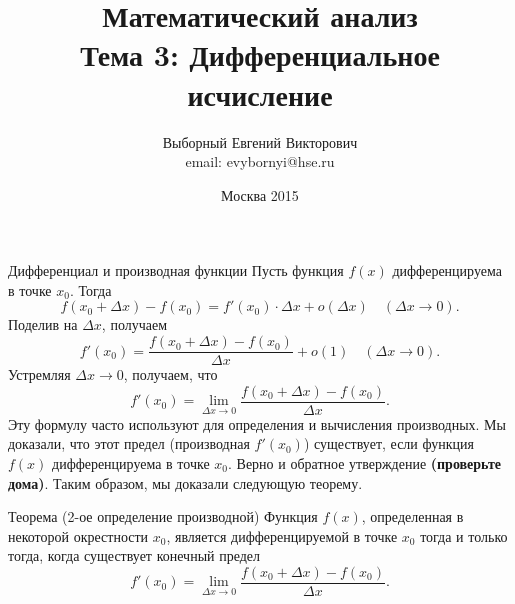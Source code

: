 \documentclass[8pt]{beamer}
\title[Дифференциальное исчисление]{Математический анализ\\ Тема 3: Дифференциальное исчисление}
\author[Выборный Е. В.]{Выборный Евгений Викторович\\ email: evybornyi@hse.ru}
\date{Москва 2015}
\begin{document}

\begin{frame}
\titlepage
\end{frame}


\begin{frame}{Дифференциал и производная функции}
Пусть функция $f(x)$ дифференцируема в точке $x_0$. Тогда
$$f(x_0+\Delta x) - f(x_0) = f'(x_0)\cdot \Delta x+o(\Delta x)\quad (\Delta x\to0).$$
Поделив на $\Delta x$, получаем
$$f'(x_0) = \frac{f(x_0+\Delta x) - f(x_0)}{\Delta x} + o(1)\quad (\Delta x\to0).$$
Устремляя $\Delta x\to0$, получаем, что
$$f'(x_0) = \lim_{\Delta x\to 0} \frac{f(x_0+\Delta x) - f(x_0)}{\Delta x}.$$
Эту формулу часто используют для определения и вычисления производных. Мы доказали, что этот предел (производная $f'(x_0)$) существует, если функция $f(x)$ дифференцируема в точке $x_0$. Верно и обратное утверждение {\bf (проверьте дома)}. Таким образом, мы доказали следующую теорему.
\begin{block}{Теорема (2-ое определение производной)}
Функция $f(x)$, определенная в некоторой окрестности $x_0$, является дифференцируемой в точке $x_0$ тогда и только тогда, когда существует конечный предел
$$f'(x_0) = \lim_{\Delta x\to 0} \frac{f(x_0+\Delta x) - f(x_0)}{\Delta x}.$$
\end{block}
\end{frame}
\end{document}
